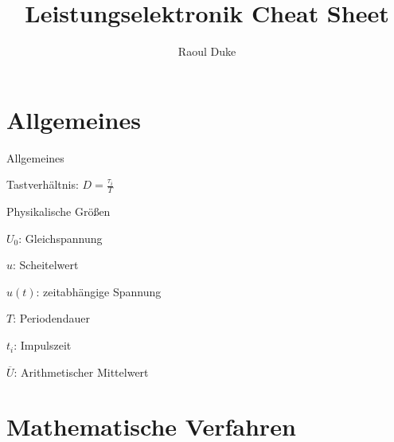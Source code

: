 \documentclass[german]{latex4ei/latex4ei_sheet}
\title{Leistungselektronik Cheat Sheet}
\author{Raoul Duke}
\begin{document}
\maketitle   %

\section{Allgemeines}
	\begin{sectionbox}
		\begin{symbolbox}{Allgemeines}
			\item Tastverhältnis: $D = \frac{\tau_i}{T}$
		\end{symbolbox}
		\begin{bluebox}{Physikalische Größen}
			\item $U_0$: Gleichspannung
			\item $\hat{u}$: Scheitelwert
			\item $u(t)$: zeitabhängige Spannung
			\item $T$: Periodendauer
			\item $t_i$: Impulszeit
			\item $\overline{U}$: Arithmetischer Mittelwert
		\end{bluebox}
	\end{sectionbox}
\section{Mathematische Verfahren}
\end{document}
